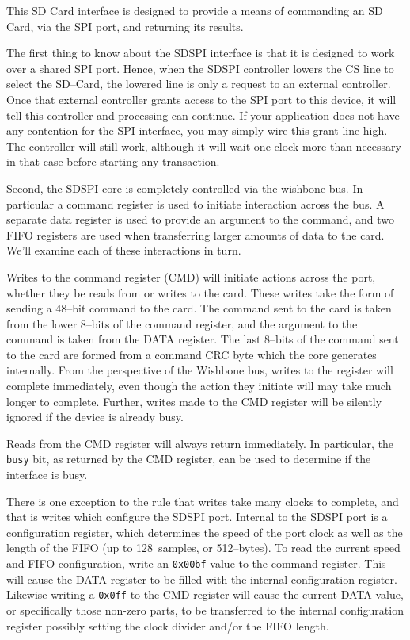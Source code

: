 \documentclass{gqtekspec}
\begin{document}
This SD Card interface is designed to provide a means of commanding an SD Card,
via the SPI port, and returning its results.  

The first thing to know about the SDSPI interface is that it is designed to work
over a shared SPI port.  Hence, when the SDSPI controller lowers the CS line to
select the SD--Card, the lowered line is only a request to an external
controller.  Once that external controller grants access to the SPI port to this
device, it will tell this controller and processing can continue.  If your
application does not have any contention for the SPI interface, you may simply
wire this grant line high.  The controller will still work, although it will
wait one clock more than necessary in that case before starting any transaction.

Second, the SDSPI core is completely controlled via the wishbone bus.  In
particular a command register is used to initiate interaction across the bus.
A separate data register is used to provide an argument to the command, and
two FIFO registers are used when transferring larger amounts of data to the
card.  We'll examine each of these interactions in turn.

Writes to the command register (CMD) will initiate actions across the port,
whether they be reads from or writes to the card.  These writes take the
form of sending a 48--bit command to the card.  The command sent to the card
is taken from the lower 8--bits of the command register, and the argument to the
command is taken from the DATA register.  The last 8--bits of the command sent
to the card are formed from a command CRC byte which the core generates
internally.  From the perspective of the Wishbone bus, writes to the register
will complete immediately, even though the action they initiate will may take
much longer to complete.  Further, writes made to the CMD register will be
silently ignored if the device is already busy.

Reads from the CMD register will always return immediately.  In particular, the
{\tt busy} bit, as returned by the CMD register, can be used to determine if the
interface is busy.

There is one exception to the rule that writes take many clocks to complete,
and that is writes which configure the SDSPI port.  Internal to the SDSPI
port is a configuration register, which determines the speed of the port
clock as well as the length of the FIFO (up to 128~samples, or 512--bytes).
To read the current speed and FIFO configuration, write an {\tt 0x00bf} value to
the command register.  This will cause the DATA register to be filled with
the internal configuration register.  Likewise writing a {\tt 0x0ff} to the
CMD register will cause the current DATA value, or specifically those non-zero
parts, to be transferred to the internal configuration register possibly setting
the clock divider and/or the FIFO length.
\end{document}
